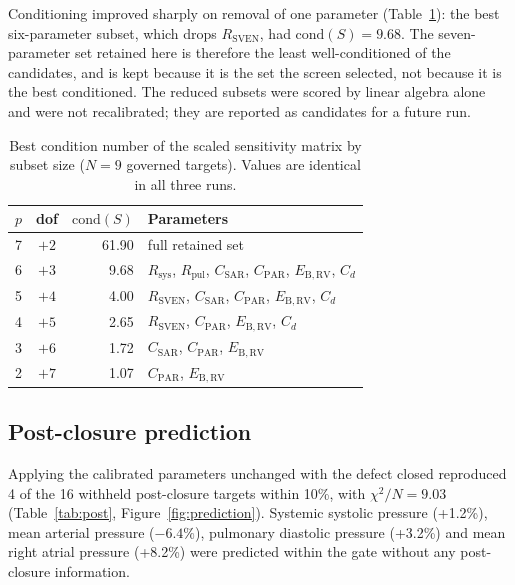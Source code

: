 Conditioning improved sharply on removal of one parameter (Table~\ref{tab:identifiability}): the best six-parameter subset, which drops $R_{\mathrm{SVEN}}$, had $\mathrm{cond}(S) = 9.68$. The seven-parameter set retained here is therefore the least well-conditioned of the candidates, and is kept because it is the set the screen selected, not because it is the best conditioned. The reduced subsets were scored by linear algebra alone and were not recalibrated; they are reported as candidates for a future run.

\begin{table}[ht]
\centering\small
\caption{Best condition number of the scaled sensitivity matrix by subset size ($N = 9$ governed targets). Values are identical in all three runs.}
\label{tab:identifiability}
\begin{tabular}{ccrl}
\toprule
$p$ & dof & $\mathrm{cond}(S)$ & \textbf{Parameters} \\
\midrule
7 & $+2$ & 61.90 & full retained set \\
6 & $+3$ & 9.68 & $R_{\mathrm{sys}}$, $R_{\mathrm{pul}}$, $C_{\mathrm{SAR}}$, $C_{\mathrm{PAR}}$, $E_{\mathrm{B,RV}}$, $C_d$ \\
5 & $+4$ & 4.00 & $R_{\mathrm{SVEN}}$, $C_{\mathrm{SAR}}$, $C_{\mathrm{PAR}}$, $E_{\mathrm{B,RV}}$, $C_d$ \\
4 & $+5$ & 2.65 & $R_{\mathrm{SVEN}}$, $C_{\mathrm{PAR}}$, $E_{\mathrm{B,RV}}$, $C_d$ \\
3 & $+6$ & 1.72 & $C_{\mathrm{SAR}}$, $C_{\mathrm{PAR}}$, $E_{\mathrm{B,RV}}$ \\
2 & $+7$ & 1.07 & $C_{\mathrm{PAR}}$, $E_{\mathrm{B,RV}}$ \\
\bottomrule
\end{tabular}
\end{table}

\subsection{Post-closure prediction}
\label{sec:results_post}
Applying the calibrated parameters unchanged with the defect closed reproduced 4 of the 16 withheld post-closure targets within 10\%, with $\chi^2/N = 9.03$ (Table~\ref{tab:post}, Figure~\ref{fig:prediction}). Systemic systolic pressure (+1.2\%), mean arterial pressure ($-6.4\%$), pulmonary diastolic pressure (+3.2\%) and mean right atrial pressure (+8.2\%) were predicted within the gate without any post-closure information.

